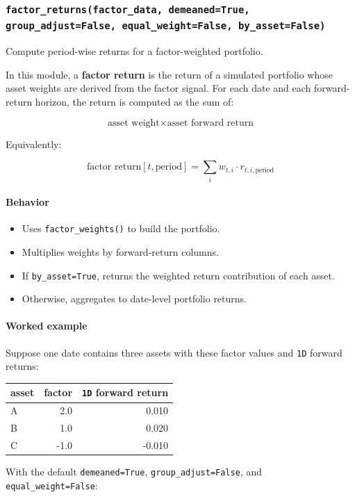 \documentclass[11pt]{article}
\begin{document}
\subsubsection{\texttt{factor\_returns(factor\_data, demeaned=True, group\_adjust=False, equal\_weight=False, by\_asset=False)}}
Compute period-wise returns for a factor-weighted portfolio.

In this module, a \textbf{factor return} is the return of a simulated portfolio whose asset weights are derived from the factor signal. For each date and each forward-return horizon, the return is computed as the sum of:

\[
\text{asset weight} \times \text{asset forward return}
\]

Equivalently:

\[
\text{factor return}[t, \text{period}] = \sum_i w_{t,i} \cdot r_{t,i,\text{period}}
\]

\paragraph{Behavior}
\begin{itemize}
  \item Uses \texttt{factor\_weights()} to build the portfolio.
  \item Multiplies weights by forward-return columns.
  \item If \texttt{by\_asset=True}, returns the weighted return contribution of each asset.
  \item Otherwise, aggregates to date-level portfolio returns.
\end{itemize}

\paragraph{Worked example}
Suppose one date contains three assets with these factor values and \texttt{1D} forward returns:

\begin{center}
\begin{tabular}{lrr}
\toprule
asset & factor & \texttt{1D} forward return \\
\midrule
A & 2.0 & 0.010 \\
B & 1.0 & 0.020 \\
C & -1.0 & -0.010 \\
\bottomrule
\end{tabular}
\end{center}

With the default \texttt{demeaned=True}, \texttt{group\_adjust=False}, and \texttt{equal\_weight=False}:
\end{document}
